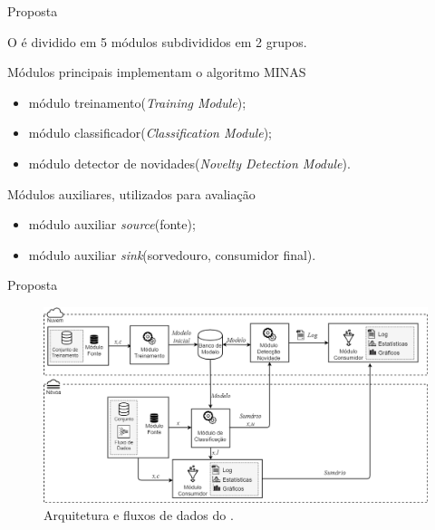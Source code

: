 \documentclass[aspectratio=43,10pt]{beamer}
\newcommand{\nota}[1]{\hspace*{-0.5cm}\textit{{\color[rgb]{1,0,0}Nota: #1}}}
\begin{document}
\newcommand{\source}{módulo auxiliar \emph{source}\xspace}
\newcommand{\sink}{módulo auxiliar \emph{sink}\xspace}

\newcommand{\offline}{módulo treinamento\xspace}
\newcommand{\classify}{módulo classificador\xspace}
\newcommand{\detector}{módulo detector de novidades\xspace}

\begin{frame}[fragile]{Proposta}

  O \mfog é dividido em 5 módulos subdivididos em 2 grupos.
  
  \begin{alertblock}{Módulos principais implementam o algoritmo MINAS}
    \begin{itemize}
      \item \offline (\emph{Training Module});
      \item \classify (\emph{Classification Module});
      \item \detector (\emph{Novelty Detection Module}).
    \end{itemize}
  \end{alertblock}
  \begin{alertblock}{Módulos auxiliares, utilizados para avaliação}
    \begin{itemize}
      \item \source (fonte);
      \item \sink (sorvedouro, consumidor final).
    \end{itemize}
  \end{alertblock}
\end{frame}

\begin{frame}[fragile]{Proposta}
\vspace{-0.5cm}
\begin{figure}[h]
  \centering
  \hspace*{-0.9cm}
  \includegraphics[width=1.15\textwidth]{figuras/mfog-arch-v3_pt-br.png}
  \caption{Arquitetura e fluxos de dados do \mfog.}
  \label{fig:arch}
\end{figure}
\end{frame}
\end{document}
